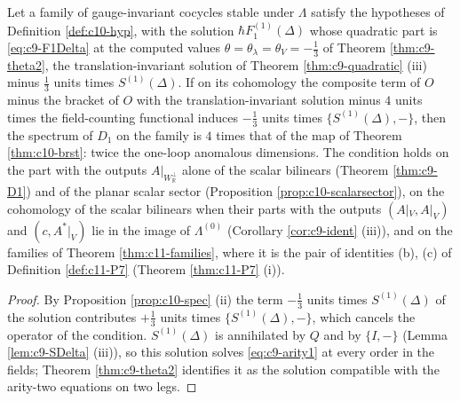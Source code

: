 \begin{corollary}
\label{cor:c10-P7}
Let a family of gauge-invariant cocycles stable under $\Lambda$ satisfy the hypotheses of Definition \ref{def:c10-hyp}, with the solution $\hbar F_1^{(1)}(\Delta)$ whose quadratic part is \eqref{eq:c9-F1Delta} at the computed values $\theta=\theta_\lambda=\theta_V=-\tfrac13$ of Theorem \ref{thm:c9-theta2}, the translation-invariant solution of Theorem \ref{thm:c9-quadratic} (iii) minus $\tfrac13$ units times $S^{(1)}(\Delta)$. If on its cohomology the composite term of $O$ minus the bracket of $O$ with the translation-invariant solution minus $4$ units times the field-counting functional induces $-\tfrac13$ units times $\{S^{(1)}(\Delta),-\}$, then the spectrum of $D_1$ on the family is $4$ times that of the map of Theorem \ref{thm:c10-brst}: twice the one-loop anomalous dimensions. The condition holds on the part with the outputs $A|_{W_{\mathbb R}^\perp}$ alone of the scalar bilinears (Theorem \ref{thm:c9-D1}) and of the planar scalar sector (Proposition \ref{prop:c10-scalarsector}), on the cohomology of the scalar bilinears when their parts with the outputs $(A|_V,A|_V)$ and $(c,A^*|_V)$ lie in the image of $\Lambda^{(0)}$ (Corollary \ref{cor:c9-ident} (iii)), and on the families of Theorem \ref{thm:c11-families}, where it is the pair of identities (b), (c) of Definition \ref{def:c11-P7} (Theorem \ref{thm:c11-P7} (i)).
\end{corollary}

\begin{proof}
By Proposition \ref{prop:c10-spec} (ii) the term $-\tfrac13$ units times $S^{(1)}(\Delta)$ of the solution contributes $+\tfrac13$ units times $\{S^{(1)}(\Delta),-\}$, which cancels the operator of the condition. $S^{(1)}(\Delta)$ is annihilated by $Q$ and by $\{I,-\}$ (Lemma \ref{lem:c9-SDelta} (iii)), so this solution solves \eqref{eq:c9-arity1} at every order in the fields; Theorem \ref{thm:c9-theta2} identifies it as the solution compatible with the arity-two equations on two legs.
\end{proof}
